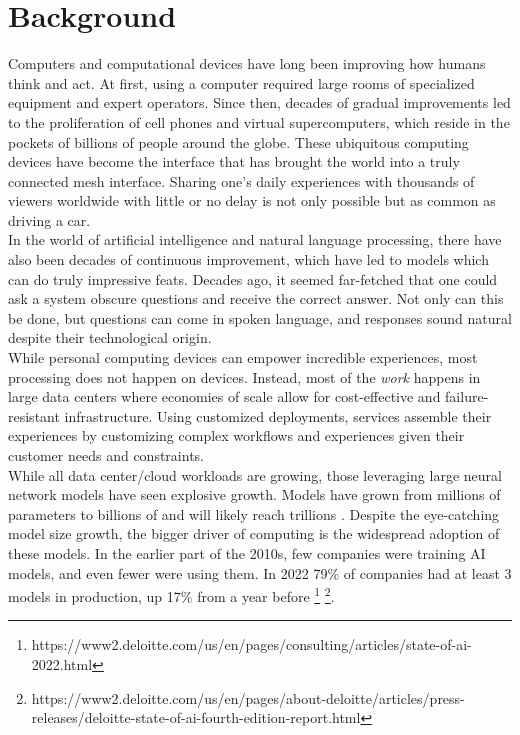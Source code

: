 \section{Background}
Computers and computational devices have long been improving how humans think and act. At first, using a computer required large rooms of specialized equipment and expert operators. Since then, decades of gradual improvements led to the proliferation of cell phones and virtual supercomputers, which reside in the pockets of billions of people around the globe. These ubiquitous computing devices have become the interface that has brought the world into a truly connected mesh interface. Sharing one's daily experiences with thousands of viewers worldwide with little or no delay is not only possible but as common as driving a car. \\
In the world of artificial intelligence and natural language processing, there have also been decades of continuous improvement, which have led to models which can do truly impressive feats. Decades ago, it seemed far-fetched that one could ask a system obscure questions and receive the correct answer. Not only can this be done, but questions can come in spoken language, and responses sound natural despite their technological origin. \\
While personal computing devices can empower incredible experiences, most processing does not happen on devices. Instead, most of the \textit{work} happens in large data centers where economies of scale allow for cost-effective and failure-resistant infrastructure. Using customized deployments, services assemble their experiences by customizing complex workflows and experiences given their customer needs and constraints. \\
While all data center/cloud workloads are growing, those leveraging large neural network models have seen explosive growth. Models have grown from millions of parameters \cite{Krizhevsky2012ImageNetCW} to billions of \cite{Brown2020LanguageMA} and will likely reach trillions \cite{Fedus2021SwitchTS}. Despite the eye-catching model size growth, the bigger driver of computing is the widespread adoption of these models. In the earlier part of the 2010s, few companies were training AI models, and even fewer were using them. In 2022 79\% of companies had at least 3 models in production, up 17\% from a year before \footnote{https://www2.deloitte.com/us/en/pages/consulting/articles/state-of-ai-2022.html} \footnote{https://www2.deloitte.com/us/en/pages/about-deloitte/articles/press-releases/deloitte-state-of-ai-fourth-edition-report.html}. \\
